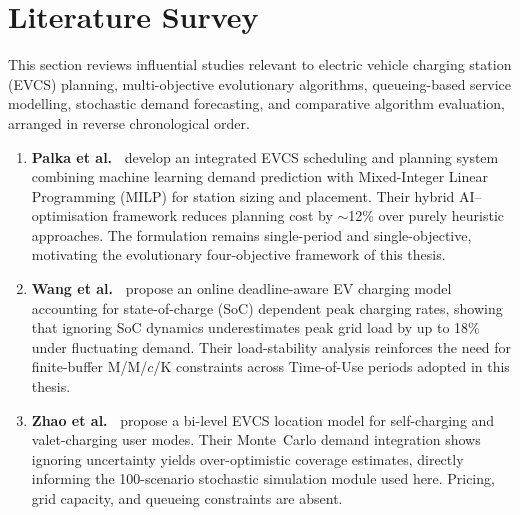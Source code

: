 
\section{Literature Survey}

This section reviews influential studies relevant to electric vehicle charging
station (EVCS) planning, multi-objective evolutionary algorithms, queueing-based
service modelling, stochastic demand forecasting, and comparative algorithm
evaluation, arranged in reverse chronological order.

\begin{enumerate}

\item \textbf{Palka et al.\ \cite{palka_planning_2025}} develop an integrated
EVCS scheduling and planning system combining machine learning demand prediction
with Mixed-Integer Linear Programming (MILP) for station sizing and placement.
Their hybrid AI--optimisation framework reduces planning cost by $\sim$12\%
over purely heuristic approaches. The formulation remains single-period and
single-objective, motivating the evolutionary four-objective framework of this
thesis.

\item \textbf{Wang et al.\ \cite{wang_deadline_2025}} propose an online
deadline-aware EV charging model accounting for state-of-charge (SoC) dependent
peak charging rates, showing that ignoring SoC dynamics underestimates peak grid
load by up to 18\% under fluctuating demand. Their load-stability analysis
reinforces the need for finite-buffer M/M/$c$/K constraints across Time-of-Use
periods adopted in this thesis.

\item \textbf{Zhao et al.\ \cite{zhao_optimal_2023}} propose a bi-level EVCS
location model for self-charging and valet-charging user modes. Their
Monte~Carlo demand integration shows ignoring uncertainty yields over-optimistic
coverage estimates, directly informing the 100-scenario stochastic simulation
module used here. Pricing, grid capacity, and queueing constraints are absent.


\end{enumerate}
